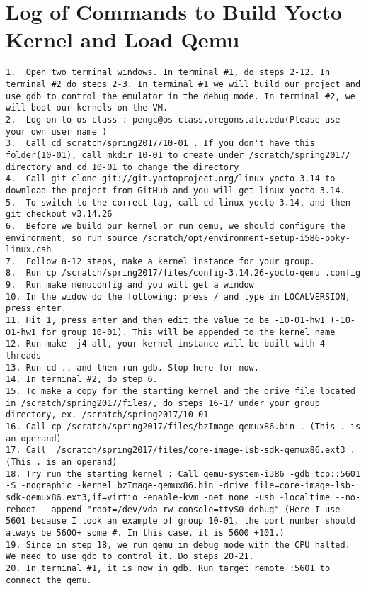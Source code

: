 \documentclass[letterpaper,10pt,titlepage]{article}
\begin{document}
\section{Log of Commands to Build Yocto Kernel and Load Qemu}
\begin{lstlisting}
1.	Open two terminal windows. In terminal #1, do steps 2-12. In terminal #2 do steps 2-3. In terminal #1 we will build our project and use gdb to control the emulator in the debug mode. In terminal #2, we will boot our kernels on the VM.
2.	Log on to os-class : pengc@os-class.oregonstate.edu(Please use your own user name )
3.	Call cd scratch/spring2017/10-01 . If you don't have this folder(10-01), call mkdir 10-01 to create under /scratch/spring2017/ directory and cd 10-01 to change the directory
4.	Call git clone git://git.yoctoproject.org/linux-yocto-3.14 to download the project from GitHub and you will get linux-yocto-3.14.
5.	To switch to the correct tag, call cd linux-yocto-3.14, and then git checkout v3.14.26 
6.	Before we build our kernel or run qemu, we should configure the environment, so run source /scratch/opt/environment-setup-i586-poky-linux.csh 
7.	Follow 8-12 steps, make a kernel instance for your group.
8.	Run cp /scratch/spring2017/files/config-3.14.26-yocto-qemu .config
9.	Run make menuconfig and you will get a window
10.	In the widow do the following: press / and type in LOCALVERSION, press enter. 
11.	Hit 1, press enter and then edit the value to be -10-01-hw1 (-10-01-hw1 for group 10-01). This will be appended to the kernel name
12.	Run make -j4 all, your kernel instance will be built with 4 threads
13.	Run cd .. and then run gdb. Stop here for now.
14.	In terminal #2, do step 6.
15.	To make a copy for the starting kernel and the drive file located in /scratch/spring2017/files/, do steps 16-17 under your group directory, ex. /scratch/spring2017/10-01 
16.	Call cp /scratch/spring2017/files/bzImage-qemux86.bin . (This . is an operand)
17.	Call  /scratch/spring2017/files/core-image-lsb-sdk-qemux86.ext3 . (This . is an operand)
18.	Try run the starting kernel : Call qemu-system-i386 -gdb tcp::5601 -S -nographic -kernel bzImage-qemux86.bin -drive file=core-image-lsb-sdk-qemux86.ext3,if=virtio -enable-kvm -net none -usb -localtime --no-reboot --append "root=/dev/vda rw console=ttyS0 debug" (Here I use 5601 because I took an example of group 10-01, the port number should always be 5600+ some #. In this case, it is 5600 +101.)
19.	Since in step 18, we run qemu in debug mode with the CPU halted. We need to use gdb to control it. Do steps 20-21.
20.	In terminal #1, it is now in gdb. Run target remote :5601 to connect the qemu.

\end{lstlisting}
\end{document}
